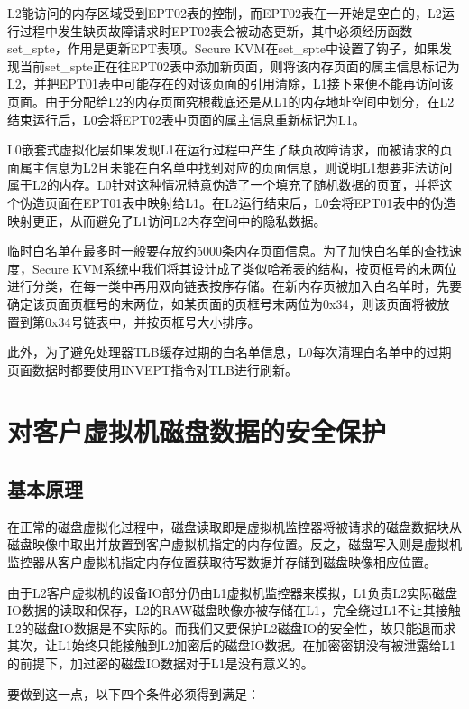 L2能访问的内存区域受到EPT02表的控制，而EPT02表在一开始是空白的，L2运行过程中发生缺页故障请求时EPT02表会被动态更新，其中必须经历函数set\_spte，作用是更新EPT表项。Secure KVM在set\_spte中设置了钩子，如果发现当前set\_spte正在往EPT02表中添加新页面，则将该内存页面的属主信息标记为L2，并把EPT01表中可能存在的对该页面的引用清除，L1接下来便不能再访问该页面。由于分配给L2的内存页面究根截底还是从L1的内存地址空间中划分，在L2结束运行后，L0会将EPT02表中页面的属主信息重新标记为L1。

L0嵌套式虚拟化层如果发现L1在运行过程中产生了缺页故障请求，而被请求的页面属主信息为L2且未能在白名单中找到对应的页面信息，则说明L1想要非法访问属于L2的内存。L0针对这种情况特意伪造了一个填充了随机数据的页面，并将这个伪造页面在EPT01表中映射给L1。在L2运行结束后，L0会将EPT01表中的伪造映射更正，从而避免了L1访问L2内存空间中的隐私数据。

临时白名单在最多时一般要存放约5000条内存页面信息。为了加快白名单的查找速度，Secure KVM系统中我们将其设计成了类似哈希表的结构，按页框号的末两位进行分类，在每一类中再用双向链表按序存储。在新内存页被加入白名单时，先要确定该页面页框号的末两位，如某页面的页框号末两位为0x34，则该页面将被放置到第0x34号链表中，并按页框号大小排序。

此外，为了避免处理器TLB缓存过期的白名单信息，L0每次清理白名单中的过期页面数据时都要使用INVEPT指令对TLB进行刷新。

\section{对客户虚拟机磁盘数据的安全保护}

\subsection{基本原理}

在正常的磁盘虚拟化过程中，磁盘读取即是虚拟机监控器将被请求的磁盘数据块从磁盘映像中取出并放置到客户虚拟机指定的内存位置。反之，磁盘写入则是虚拟机监控器从客户虚拟机指定内存位置获取待写数据并存储到磁盘映像相应位置。

由于L2客户虚拟机的设备IO部分仍由L1虚拟机监控器来模拟，L1负责L2实际磁盘IO数据的读取和保存，L2的RAW磁盘映像亦被存储在L1，完全绕过L1不让其接触L2的磁盘IO数据是不实际的。而我们又要保护L2磁盘IO的安全性，故只能退而求其次，让L1始终只能接触到L2加密后的磁盘IO数据。在加密密钥没有被泄露给L1的前提下，加过密的磁盘IO数据对于L1是没有意义的。

要做到这一点，以下四个条件必须得到满足：

